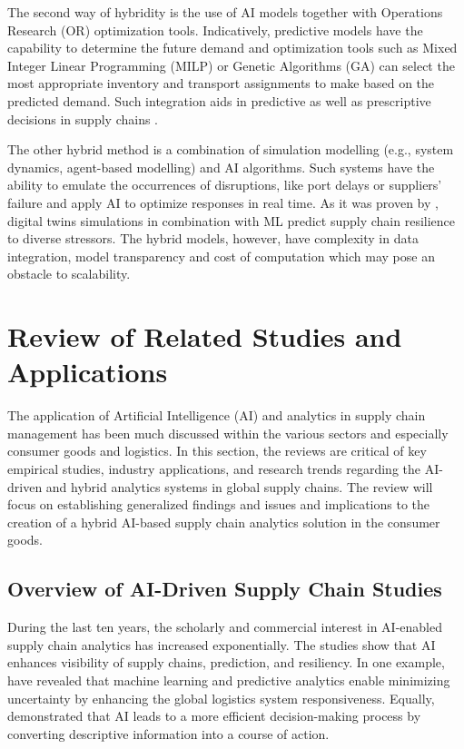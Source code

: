 The second way of hybridity is the use of AI models together with Operations Research (OR) optimization tools. Indicatively, predictive models have the capability to determine the future demand and optimization tools such as Mixed Integer Linear Programming (MILP) or Genetic Algorithms (GA) can select the most appropriate inventory and transport assignments to make based on the predicted demand. Such integration aids in predictive as well as prescriptive decisions in supply chains \autocite{Wamba2022AIenabled}.

The other hybrid method is a combination of simulation modelling (e.g., system dynamics, agent-based modelling) and AI algorithms. Such systems have the ability to emulate the occurrences of disruptions, like port delays or suppliers’ failure and apply AI to optimize responses in real time. As it was proven by \autocite{ivanov_digital_2025}, digital twins simulations in combination with ML predict supply chain resilience to diverse stressors. The hybrid models, however, have complexity in data integration, model transparency and cost of computation which may pose an obstacle to scalability.


\section{Review of Related Studies and Applications}


The application of Artificial Intelligence (AI) and analytics in supply chain management has been much discussed within the various sectors and especially consumer goods and logistics. In this section, the reviews are critical of key empirical studies, industry applications, and research trends regarding the AI-driven and hybrid analytics systems in global supply chains. The review will focus on establishing generalized findings and issues and implications to the creation of a hybrid AI-based supply chain analytics solution in the consumer goods.

\subsection{Overview of AI-Driven Supply Chain Studies}

During the last ten years, the scholarly and commercial interest in AI-enabled supply chain analytics has increased exponentially. The studies show that AI enhances visibility of supply chains, prediction, and resiliency. In one example, \autocite{ivanov_digital_2025} have revealed that machine learning and predictive analytics enable minimizing uncertainty by enhancing the global logistics system responsiveness. Equally, \autocite{Wamba2022AIenabled} demonstrated that AI leads to a more efficient decision-making process by converting descriptive information into a course of action.

